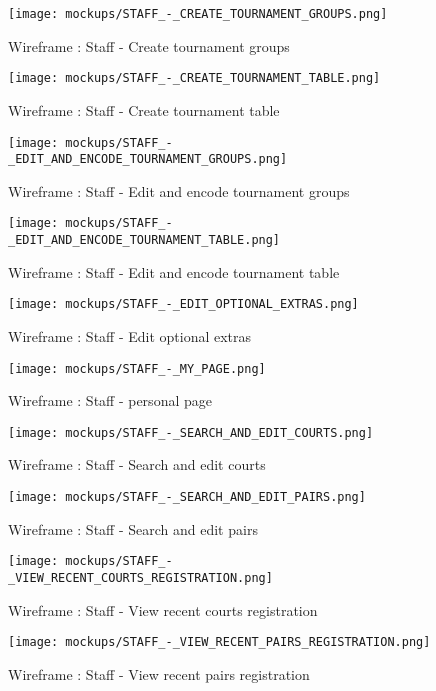 \begin{figure}[!ht]
    \centering
    \texttt{[image: mockups/STAFF\_-\_CREATE\_TOURNAMENT\_GROUPS.png]}
    \caption{Wireframe : Staff - Create tournament groups}
\end{figure}
\FloatBarrier

\begin{figure}[!ht]
    \centering
    \texttt{[image: mockups/STAFF\_-\_CREATE\_TOURNAMENT\_TABLE.png]}
    \caption{Wireframe : Staff - Create tournament table}
\end{figure}
\FloatBarrier

\begin{figure}[!ht]
    \centering
    \texttt{[image: mockups/STAFF\_-\_EDIT\_AND\_ENCODE\_TOURNAMENT\_GROUPS.png]}
    \caption{Wireframe : Staff - Edit and encode tournament groups}
\end{figure}
\FloatBarrier

\begin{figure}[!ht]
    \centering
    \texttt{[image: mockups/STAFF\_-\_EDIT\_AND\_ENCODE\_TOURNAMENT\_TABLE.png]}
    \caption{Wireframe : Staff - Edit and encode tournament table}
\end{figure}
\FloatBarrier

\begin{figure}[!ht]
    \centering
    \texttt{[image: mockups/STAFF\_-\_EDIT\_OPTIONAL\_EXTRAS.png]}
    \caption{Wireframe : Staff - Edit optional extras}
\end{figure}
\FloatBarrier

\begin{figure}[!ht]
    \centering
    \texttt{[image: mockups/STAFF\_-\_MY\_PAGE.png]}
    \caption{Wireframe : Staff - personal page}
\end{figure}
\FloatBarrier

\begin{figure}[!ht]
    \centering
    \texttt{[image: mockups/STAFF\_-\_SEARCH\_AND\_EDIT\_COURTS.png]}
    \caption{Wireframe : Staff - Search and edit courts}
\end{figure}
\FloatBarrier

\begin{figure}[!ht]
    \centering
    \texttt{[image: mockups/STAFF\_-\_SEARCH\_AND\_EDIT\_PAIRS.png]}
    \caption{Wireframe : Staff - Search and edit pairs}
\end{figure}
\FloatBarrier

\begin{figure}[!ht]
    \centering
    \texttt{[image: mockups/STAFF\_-\_VIEW\_RECENT\_COURTS\_REGISTRATION.png]}
    \caption{Wireframe : Staff - View recent courts registration}
\end{figure}
\FloatBarrier

\begin{figure}[!ht]
    \centering
    \texttt{[image: mockups/STAFF\_-\_VIEW\_RECENT\_PAIRS\_REGISTRATION.png]}
    \caption{Wireframe : Staff - View recent pairs registration}
\end{figure}
\FloatBarrier

